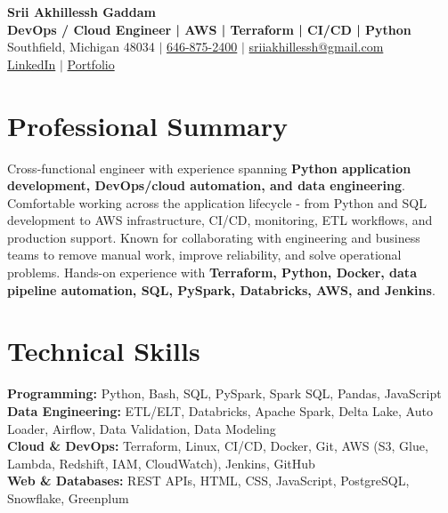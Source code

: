 \documentclass[letterpaper,10pt]{article}
\begin{document}
\fontsize{9.35pt}{10.45pt}\selectfont

\begin{center}
    {\LARGE \textbf{Srii Akhillessh Gaddam}} \\[-1pt]
    \textbf{DevOps / Cloud Engineer | AWS | Terraform | CI/CD | Python} \\[2pt]
    Southfield, Michigan 48034 $|$
    \href{tel:6468752400}{646-875-2400} $|$
    \href{mailto:sriiakhillessh@gmail.com}{sriiakhillessh@gmail.com} \\[1pt]
    \href{https://www.linkedin.com/in/srii-akhiilessh-gaddam-b48668191/}{LinkedIn} $|$
    \href{https://sriiakhillesshg.github.io/portfolio/}{Portfolio}
\end{center}
\vspace{-8pt}

\section{Professional Summary}
\small{Cross-functional engineer with experience spanning \textbf{Python application development, DevOps/cloud automation, and data engineering}. Comfortable working across the application lifecycle - from Python and SQL development to AWS infrastructure, CI/CD, monitoring, ETL workflows, and production support. Known for collaborating with engineering and business teams to remove manual work, improve reliability, and solve operational problems. Hands-on experience with \textbf{Terraform, Python, Docker, data pipeline automation, SQL, PySpark, Databricks, AWS, and Jenkins}.}

\section{Technical Skills}
\small{
\textbf{Programming:} Python, Bash, SQL, PySpark, Spark SQL, Pandas, JavaScript \\
\textbf{Data Engineering:} ETL/ELT, Databricks, Apache Spark, Delta Lake, Auto Loader, Airflow, Data Validation, Data Modeling \\
\textbf{Cloud \& DevOps:} Terraform, Linux, CI/CD, Docker, Git, AWS (S3, Glue, Lambda, Redshift, IAM, CloudWatch), Jenkins, GitHub \\
\textbf{Web \& Databases:} REST APIs, HTML, CSS, JavaScript, PostgreSQL, Snowflake, Greenplum
}
\end{document}
